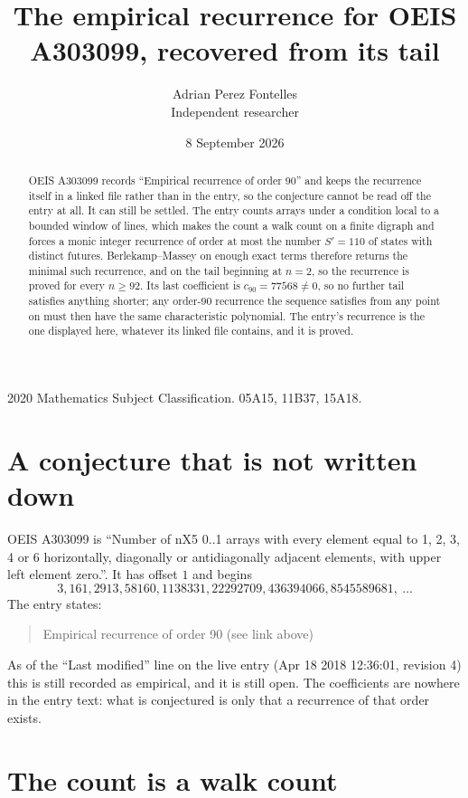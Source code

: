 \documentclass[11pt,a4paper]{article}
\title{The empirical recurrence for OEIS A303099, recovered from its tail}
\author{Adrian Perez Fontelles\\ \small Independent researcher}
\date{8 September 2026}
\theoremstyle{plain}
\theoremstyle{definition}
\begin{document}
\maketitle

\begin{abstract}
OEIS A303099 records ``Empirical recurrence of order $90$'' and keeps the recurrence itself in
a linked file rather than in the entry, so the conjecture cannot be read off the entry at all.
It can still be settled. The entry counts arrays under a condition local to a bounded window of
lines, which makes the count a walk count on a finite digraph and forces a monic integer
recurrence of order at most the number $S'=110$ of states with distinct futures. Berlekamp--Massey on
enough exact terms therefore returns the minimal such recurrence, and on the tail beginning at $n=2$, so the recurrence is proved for every $n\ge92$.
Its last coefficient is $c_{90}=77568\neq0$, so no further tail satisfies anything
shorter; any order-$90$ recurrence the sequence satisfies from any point on must then have
the same characteristic polynomial. The entry's recurrence is the one displayed here, whatever
its linked file contains, and it is proved.
\end{abstract}

\noindent\small 2020 Mathematics Subject Classification. 05A15, 11B37, 15A18.\normalsize

\section{A conjecture that is not written down}

OEIS A303099 is ``Number of nX5 0..1 arrays with every element equal to 1, 2, 3, 4 or 6 horizontally, diagonally or antidiagonally adjacent elements, with upper left element zero.''. It has offset $1$ and begins
\[
3, 161, 2913, 58160, 1138331, 22292709, 436394066, 8545589681,\ \dots
\]
The entry states:
\begin{quote}
Empirical recurrence of order 90 (see link above)
\end{quote}
As of the ``Last modified'' line on the live entry (Apr 18 2018 12:36:01, revision 4)
this is still recorded as empirical, and it is still open. The coefficients are nowhere in the
entry text: what is conjectured is only that a recurrence of that order exists.

\section{The count is a walk count}
\end{document}
